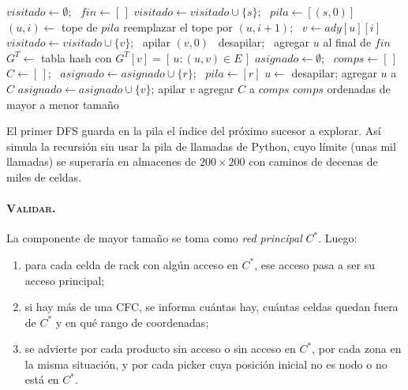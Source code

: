 \documentclass[11pt,a4paper]{article}
\theoremstyle{definition}
\begin{document}
\begin{algorithm}[H]
\caption{\textsc{Kosaraju-Iterativo}$(G)$}\label{alg:kosaraju}
\begin{algorithmic}[1]
\State $visitado\gets\emptyset$; \ $fin\gets[\,]$
 
  \State $visitado\gets visitado\cup\{s\}$; \ $pila\gets[(s,0)]$
    \State $(u,i)\gets$ tope de $pila$
      \State reemplazar el tope por $(u,i+1)$; \ $v\gets ady[u][i]$
       $visitado\gets visitado\cup\{v\}$; \ apilar $(v,0)$ \EndIf
    \Else \ desapilar; \ agregar $u$ al final de $fin$ 
    \EndIf
  \EndWhile
\EndFor
\State $G^T\gets$ tabla hash con $G^T[v]=[\,u : (u,v)\in E\,]$ 
\State $asignado\gets\emptyset$; \ $comps\gets[\,]$
 
  \State $C\gets[\,]$; \ $asignado\gets asignado\cup\{r\}$; \ $pila\gets[r]$
    \State $u\gets$ desapilar; agregar $u$ a $C$
     $asignado\gets asignado\cup\{v\}$; apilar $v$ \EndFor
  \EndWhile
  \State agregar $C$ a $comps$
\EndFor
\State \Return $comps$ ordenadas de mayor a menor tamaño
\end{algorithmic}
\end{algorithm}

El primer DFS guarda en la pila el índice del próximo sucesor a explorar. Así simula la recursión sin usar la pila de llamadas de Python, cuyo límite (unas mil llamadas) se superaría en almacenes de $200\times200$ con caminos de decenas de miles de celdas.

\paragraph{\textsc{Validar}.} La componente de mayor tamaño se toma como \emph{red principal} $C^\ast$. Luego:
\begin{enumerate}[leftmargin=*]
\item para cada celda de rack con algún acceso en $C^\ast$, ese acceso pasa a ser su acceso principal;
\item si hay más de una CFC, se informa cuántas hay, cuántas celdas quedan fuera de $C^\ast$ y en qué rango de coordenadas;
\item se advierte por cada producto sin acceso o sin acceso en $C^\ast$, por cada zona en la misma situación, y por cada picker cuya posición inicial no es nodo o no está en $C^\ast$.
\end{enumerate}
\end{document}
